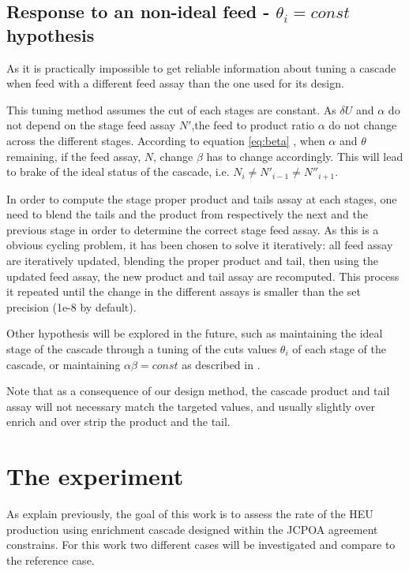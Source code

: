\documentclass{anstrans}
\begin{document}
\subsection{Response to an non-ideal feed - $\theta_{i} = const$ hypothesis}

As it is practically impossible to get reliable information about tuning a
cascade when feed with a different feed assay than the one used for its design.

This tuning method assumes the cut of each stages are constant. As $\delta
U$ and $\alpha$ do not depend on the stage feed assay $N'$,the feed to product
ratio $\alpha$ do not change across the different stages. According to equation
\eqref{eq:beta} , when $\alpha$ and $\theta$ remaining, if the feed assay,
$N$, change $\beta$ has to change accordingly.  This will lead to brake of the
ideal status of the cascade, i.e.  $N_{i} \neq N'_{i-1} \neq N''_{i+1}$.

In order to compute the stage proper product and tails assay at each stages, one
need to blend the tails and the product from respectively the next and the
previous stage in order to determine the correct stage feed assay. As this is a
obvious cycling problem, it has been chosen to solve it iteratively: all feed
assay are iteratively updated, blending the proper product and tail, then using
the updated feed assay, the new product and tail assay are recomputed. This
process it repeated until the change in the different assays is smaller than the
set precision (1e-8 by default).

Other hypothesis will be explored in the future, such as maintaining the ideal
stage of the cascade through a tuning of the cuts values $\theta_{i}$ of each
stage of the cascade, or maintaining $\alpha\beta = const$ as described in
\cite{walker2017}.

Note that as a consequence of our design method, the cascade product and tail
assay will not necessary match the targeted values, and usually slightly over
enrich and over strip the product and the tail.

\section{The experiment}

As explain previously, the goal of this work is to assess the rate of the HEU
production using enrichment cascade designed within the JCPOA agreement
constrains. For this work two different cases will be investigated and compare
to the reference case.
\end{document}
